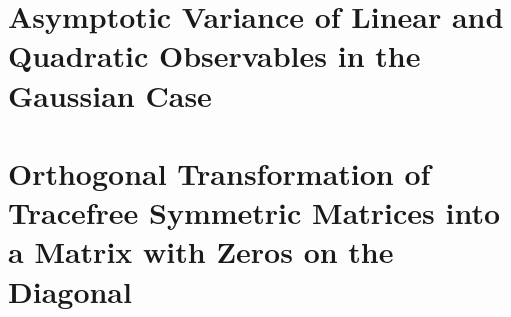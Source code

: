 \documentclass[onecollarge]{svjour2}       %
\begin{document}
\section{Asymptotic Variance of Linear and Quadratic Observables in the Gaussian Case}
\label{app:Gaussian_proofs}



\section{Orthogonal Transformation of Tracefree Symmetric Matrices into a Matrix with Zeros on the Diagonal}
\label{tracefree}




\end{document}
